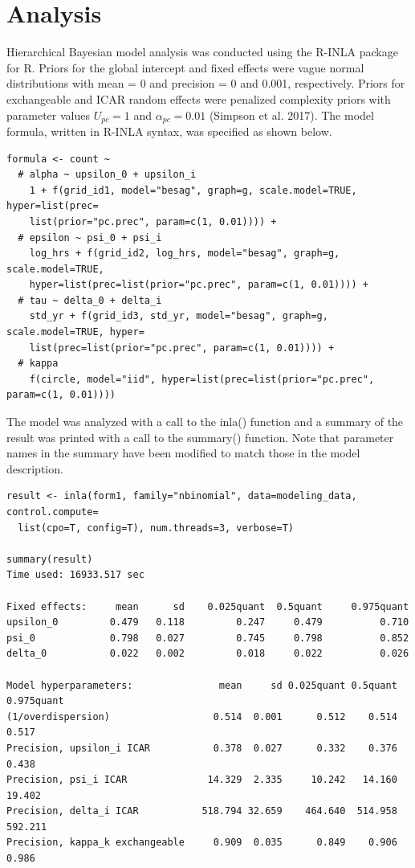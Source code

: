 \documentclass[]{article}
\begin{document}
\section{Analysis}
Hierarchical Bayesian model analysis was conducted using the R-INLA package for R. Priors for the global intercept and fixed effects were vague normal distributions with mean = 0 and precision = 0 and 0.001, respectively. Priors for exchangeable and ICAR random effects were penalized complexity priors with parameter values $U_{pc} = 1$ and $\alpha_{pc} = 0.01$ (Simpson et al. 2017). The model formula, written in R-INLA syntax, was specified as shown below.

\begin{verbatim}
formula <- count ~
  # alpha ~ upsilon_0 + upsilon_i
    1 + f(grid_id1, model="besag", graph=g, scale.model=TRUE, hyper=list(prec=
    list(prior="pc.prec", param=c(1, 0.01)))) +
  # epsilon ~ psi_0 + psi_i
    log_hrs + f(grid_id2, log_hrs, model="besag", graph=g, scale.model=TRUE, 
    hyper=list(prec=list(prior="pc.prec", param=c(1, 0.01)))) +
  # tau ~ delta_0 + delta_i
    std_yr + f(grid_id3, std_yr, model="besag", graph=g, scale.model=TRUE, hyper=
    list(prec=list(prior="pc.prec", param=c(1, 0.01)))) +
  # kappa
    f(circle, model="iid", hyper=list(prec=list(prior="pc.prec", param=c(1, 0.01))))
\end{verbatim}

The model was analyzed with a call to the inla() function and a summary of the result was printed with a call to the summary() function. Note that parameter names in the summary have been modified to match those in the model description.

\begin{verbatim}
result <- inla(form1, family="nbinomial", data=modeling_data, control.compute=
  list(cpo=T, config=T), num.threads=3, verbose=T)

summary(result)
Time used: 16933.517 sec

Fixed effects:     mean      sd    0.025quant  0.5quant     0.975quant
upsilon_0         0.479   0.118         0.247     0.479          0.710
psi_0             0.798   0.027         0.745     0.798          0.852
delta_0           0.022   0.002         0.018     0.022          0.026

Model hyperparameters:               mean     sd 0.025quant 0.5quant 0.975quant
(1/overdispersion)                  0.514  0.001      0.512    0.514      0.517
Precision, upsilon_i ICAR           0.378  0.027      0.332    0.376      0.438
Precision, psi_i ICAR              14.329  2.335     10.242   14.160     19.402
Precision, delta_i ICAR           518.794 32.659    464.640  514.958    592.211
Precision, kappa_k exchangeable     0.909  0.035      0.849    0.906      0.986
\end{verbatim}
\end{document}
